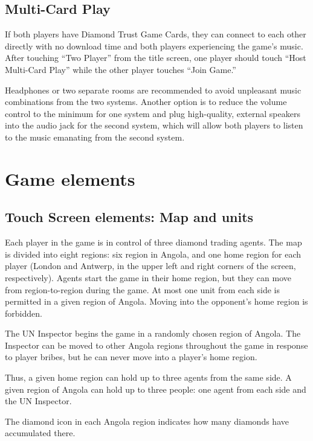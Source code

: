 \documentclass[8pt]{extbook}
\begin{document}
\subsection{Multi-Card Play}
If both players have Diamond Trust Game Cards, they can connect to each other directly with no download time and both players experiencing the game's music.  After touching ``Two Player'' from the title screen, one player should touch ``Host Multi-Card Play'' while the other player touches ``Join Game.''

Headphones or two separate rooms are recommended to avoid unpleasant music combinations from the two systems.  Another option is to reduce the volume control to the minimum for one system and plug high-quality, external speakers into the audio jack for the second system, which will allow both players to listen to the music emanating from the second system.









\section{Game elements}

\subsection{Touch Screen elements:  Map and units}
Each player in the game is in control of three diamond trading agents.  The map is divided into eight regions:  six region in Angola, and one home region for each player (London and Antwerp, in the upper left and right corners of the screen, respectively).  Agents start the game in their home region, but they can move from region-to-region during the game.  At most one unit from each side is permitted in a given region of Angola.  Moving into the opponent's home region is forbidden.

The UN Inspector begins the game in a randomly chosen region of Angola.  The Inspector can be moved to other Angola regions throughout the game in response to player bribes, but he can never move into a player's home region.

Thus, a given home region can hold up to three agents from the same side.  A given region of Angola can hold up to three people:  one agent from each side and the UN Inspector.

The diamond icon in each Angola region indicates how many diamonds have accumulated there.
\end{document}
